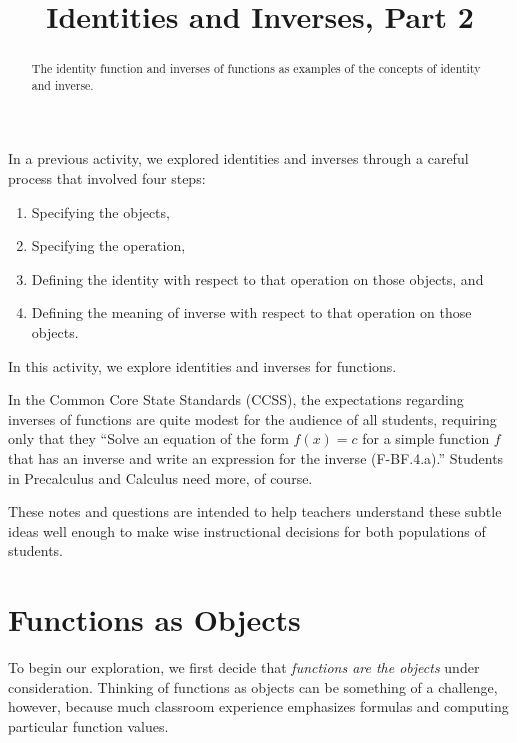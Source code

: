 \documentclass[space,handout,nooutcomes]{ximera}
\title{Identities and Inverses, Part 2}
\begin{document}
\begin{abstract}
The identity function and inverses of functions as examples of the concepts of identity and inverse.    
\end{abstract}
\maketitle


%
%
In a previous activity, we explored identities and inverses through a careful process that 
involved four steps:  
\begin{enumerate}
\item Specifying the objects,
\item Specifying the operation, 
\item Defining the identity with respect to that operation on those objects, and
\item Defining the meaning of inverse with respect to that operation on those objects. 
\end{enumerate}

In this activity, we explore identities and inverses for functions.  
\begin{remark}
In the Common Core State Standards (CCSS), the expectations regarding inverses of functions are quite modest for the audience of all students, requiring only that they ``Solve an equation of the form $f(x) = c$ for a simple function $f$ that has an inverse and write an expression for the inverse (F-BF.4.a).''  Students in Precalculus and Calculus need more, of course.  

These notes and questions are intended to help teachers understand these subtle ideas well enough to make wise instructional decisions for both populations of students.   
\end{remark}

\section*{Functions as Objects}
To begin our exploration, we first decide that \emph{functions are the objects} under consideration.  Thinking of functions as objects can be something of a challenge, however, because much classroom experience  emphasizes formulas and computing particular function values. 
\end{document}
